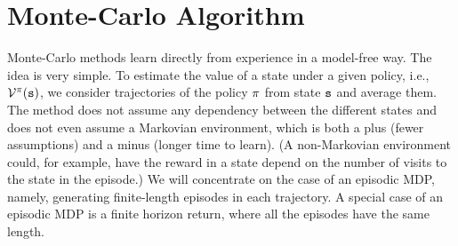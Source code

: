 






\section{Monte-Carlo Algorithm}
\label{sec:MC}

Monte-Carlo methods learn directly from experience in a model-free
way. The idea is very simple. To estimate the value of a
state under a given policy, i.e., $\mathcal{V}^\pi({\tt s})$, we
consider trajectories of the policy $\pi$ from state ${\tt s}$
and average them. The method does not assume any dependency between
the different states and does not even assume a Markovian
environment, which is both a plus (fewer assumptions) and a minus
(longer time to learn). (A non-Markovian environment could, for
example, have the reward in a state depend on the number of visits
to the state in the episode.) We will concentrate on the case of an
episodic MDP, namely, generating finite-length episodes in each
trajectory. A special case of an episodic MDP is a finite horizon
return, where all the episodes have the same length.

